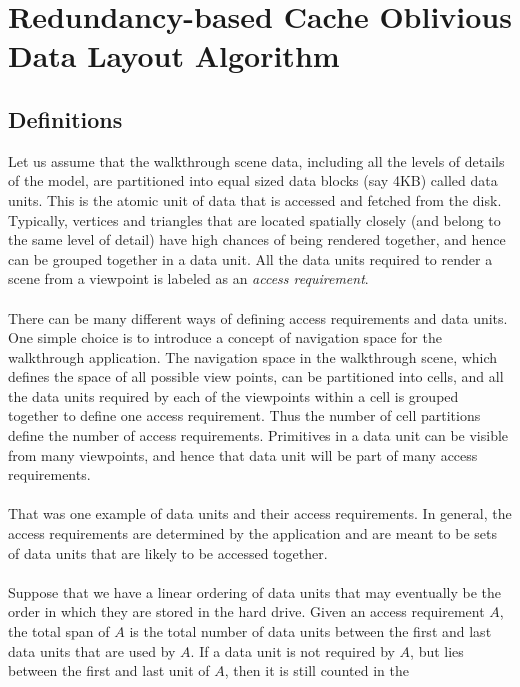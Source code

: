 
\section{Redundancy-based Cache Oblivious Data Layout Algorithm}


\subsection{Definitions}

Let us assume that the walkthrough scene data, including all the levels of
details of the model, are partitioned into equal sized data blocks (say 4KB)
called data units. This is the atomic unit of data that is accessed and fetched
from the disk. Typically, vertices and triangles that are located spatially
closely (and belong to the same level of detail) have high chances of being
rendered together, and hence can be grouped together in a data unit. All the
data units required to render a scene from a viewpoint is labeled as an {\em
access requirement}. \\
\\
There can be many different ways of defining access requirements and data
units. One simple choice is to introduce a concept of navigation space for the
walkthrough application.
The navigation space in the walkthrough scene, which defines the space of all
possible view points, can be partitioned into cells,  and all the data units required by each of the viewpoints within a cell is grouped together to define one access requirement. Thus the
number of cell partitions define the number of access requirements. Primitives
in a data unit can be visible from many viewpoints, and hence that data unit
will be part of many access requirements. \\
\\
That was one example of data units and their access requirements. In general,
the access requirements are determined by the application and are meant to be
sets of data units that are likely to be accessed together. \\
\\
Suppose that we have a linear ordering of data units that may eventually be the
order in which they are stored in the hard drive.  Given an access requirement
$A$, the total span of $A$ is the total number of data units between the first
and last data units that are used by $A$. If a data unit is not required by $A$, but
lies between the first and last unit of $A$, then it is still counted in the
